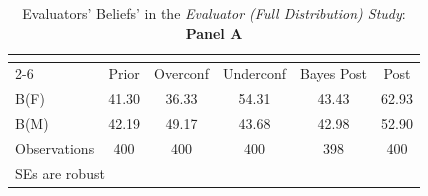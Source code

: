 \begin{table}[htbp]\centering
\caption{Evaluators' Beliefs' in the \textit{Evaluator (Full Distribution) Study}: \textbf{Panel A}}
\begin{tabular}{l*{5}{c}}
\hline\hline
                &\multicolumn{5}{c}{}                             \\\cmidrule(lr){2-6}
                &\multicolumn{1}{c}{Prior}&\multicolumn{1}{c}{Overconf}&\multicolumn{1}{c}{Underconf}&\multicolumn{1}{c}{Bayes Post}&\multicolumn{1}{c}{Post}\\
\hline
B(F)            &    41.30&    36.33&    54.31&    43.43&    62.93\\
B(M)            &    42.19&    49.17&    43.68&    42.98&    52.90\\
\hline
Observations    &      400&      400&      400&      398&      400\\
\hline\hline
\multicolumn{6}{l}{\footnotesize SEs are robust}\\
\end{tabular}
\end{table}
